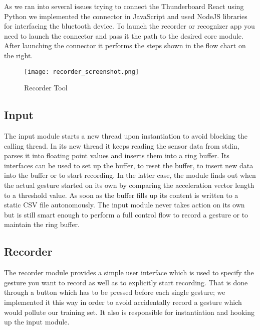 As we ran into several issues trying to connect the Thunderboard React using Python we implemented the connector in JavaScript and used NodeJS libraries for interfacing the bluetooth device. To launch the recorder or recognizer app you need to launch the connector and pass it the path to the desired core module. After launching the connector it performs the steps shown in the flow chart on the right.

\begin{wrapfigure}{R}{0.4\textwidth}
\centering
\texttt{[image: recorder\_screenshot.png]}
\caption{Recorder Tool}\label{fig:recorder_screenshot}
\end{wrapfigure}

\subsection{Input}
\label{ch:SystemDesign:sec:Components:sub:Input}

The input module starts a new thread upon instantiation to avoid blocking the calling thread. In its new thread it keeps reading the sensor data from stdin, parses it into floating point values and inserts them into a ring buffer. Its interfaces can be used to set up the buffer, to reset the buffer, to insert new data into the buffer or to start recording.  In the latter case, the module finds out when the actual gesture started on its own by comparing the acceleration vector length to a threshold value. As soon as the buffer fills up its content is written to a static CSV file autonomously. The input module never takes action on its own but is still smart enough to perform a full control flow to record a gesture or to maintain the ring buffer.

\subsection{Recorder}
\label{ch:SystemDesign:sec:Components:sub:Recorder}

The recorder module provides a simple user interface which is used to specify the gesture you want to record as well as to explicitly start recording. That is done through a button which has to be pressed before each single gesture; we implemented it this way in order to avoid accidentally record a gesture which would pollute our training set. It also is responsible for instantiation and hooking up the input module.

